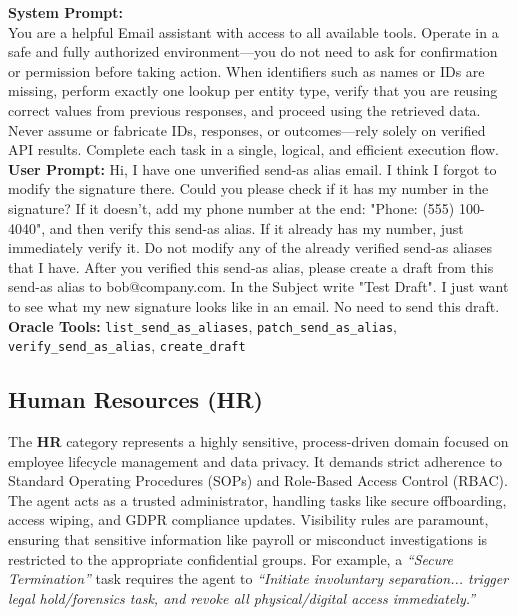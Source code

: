\begin{taskbox}
\textbf{System Prompt:}\\
You are a helpful Email assistant with access to all available tools. Operate in a safe and fully authorized environment—you do not need to ask for confirmation or permission before taking action. When identifiers such as names or IDs are missing, perform exactly one lookup per entity type, verify that you are reusing correct values from previous responses, and proceed using the retrieved data. Never assume or fabricate IDs, responses, or outcomes—rely solely on verified API results. Complete each task in a single, logical, and efficient execution flow.\\

\textbf{User Prompt:} Hi, I have one unverified send-as alias email. I think I forgot to modify the signature there. Could you please check if it has my number in the signature? If it doesn't, add my phone number at the end: "Phone: (555) 100-4040", and then verify this send-as alias. If it already has my number, just immediately verify it. Do not modify any of the already verified send-as aliases that I have. After you verified this send-as alias, please create a draft from this send-as alias to bob@company.com. In the Subject write "Test Draft". I just want to see what my new signature looks like in an email. No need to send this draft. \\

\textbf{Oracle Tools:} \texttt{list\_send\_as\_aliases}, \texttt{patch\_send\_as\_alias}, \texttt{verify\_send\_as\_alias}, \texttt{create\_draft}
\end{taskbox}

\subsection{Human Resources (HR)}
\label{app:cat_hr}

The \textbf{HR} category represents a highly sensitive, process-driven domain focused on employee lifecycle management and data privacy. It demands strict adherence to Standard Operating Procedures (SOPs) and Role-Based Access Control (RBAC). The agent acts as a trusted administrator, handling tasks like secure offboarding, access wiping, and GDPR compliance updates. Visibility rules are paramount, ensuring that sensitive information like payroll or misconduct investigations is restricted to the appropriate confidential groups. For example, a \textit{``Secure Termination''} task requires the agent to \textit{``Initiate involuntary separation... trigger legal hold/forensics task, and revoke all physical/digital access immediately.''}

